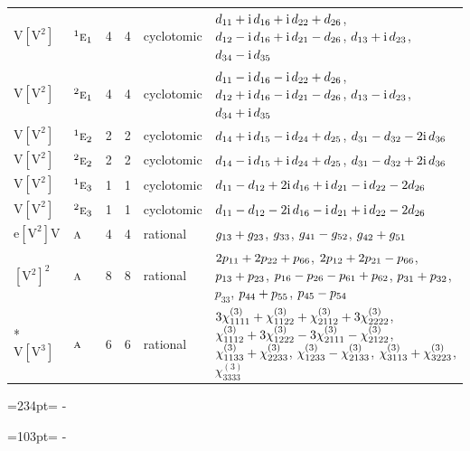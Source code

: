 \documentclass[10pt,a4paper]{article}
\newcommand{\needspace}[1]{\par\penalty-100\begingroup\dimen0=#1\relax\dimen2=\pagegoal
  \advance\dimen2-\pagetotal\ifdim\dimen0>\dimen2\relax\ifdim\dimen2>0pt\vfil\break\fi\fi
  \endgroup}
\numberwithin{equation}{section}
\newcommand{\irr}[1]{\text{\normalfont\scshape #1}}
\newcommand{\conjpair}[1]{{}^{#1}}
\newcommand{\iunit}{\mathrm{i}}
\newcommand{\jahn}[1]{\mathrm{#1}}
\newlength{\fillwidth}\newlength{\cellwidth}\newlength{\colwidth}
\newcommand{\signbreak}{\penalty100\relax}
\begin{document}
{\begin{longtable}{@{}llrrl>{\RaggedRight\arraybackslash}p{\fillwidth}@{}}
$\jahn{V[V^{2}]}$ & $\conjpair{1}\irr{e}_{1}$ & 4 & 4 & cyclotomic & $d_{11} +\signbreak \iunit{}\,d_{16} +\signbreak \iunit{}\,d_{22} +\signbreak d_{26}$, $d_{12} -\signbreak \iunit{}\,d_{16} +\signbreak \iunit{}\,d_{21} -\signbreak d_{26}$, $d_{13} +\signbreak \iunit{}\,d_{23}$, $d_{34} -\signbreak \iunit{}\,d_{35}$\\
$\jahn{V[V^{2}]}$ & $\conjpair{2}\irr{e}_{1}$ & 4 & 4 & cyclotomic & $d_{11} -\signbreak \iunit{}\,d_{16} -\signbreak \iunit{}\,d_{22} +\signbreak d_{26}$, $d_{12} +\signbreak \iunit{}\,d_{16} -\signbreak \iunit{}\,d_{21} -\signbreak d_{26}$, $d_{13} -\signbreak \iunit{}\,d_{23}$, $d_{34} +\signbreak \iunit{}\,d_{35}$\\
$\jahn{V[V^{2}]}$ & $\conjpair{1}\irr{e}_{2}$ & 2 & 2 & cyclotomic & $d_{14} +\signbreak \iunit{}\,d_{15} -\signbreak \iunit{}\,d_{24} +\signbreak d_{25}$, $d_{31} -\signbreak d_{32} -\signbreak 2\iunit{}\,d_{36}$\\
$\jahn{V[V^{2}]}$ & $\conjpair{2}\irr{e}_{2}$ & 2 & 2 & cyclotomic & $d_{14} -\signbreak \iunit{}\,d_{15} +\signbreak \iunit{}\,d_{24} +\signbreak d_{25}$, $d_{31} -\signbreak d_{32} +\signbreak 2\iunit{}\,d_{36}$\\
$\jahn{V[V^{2}]}$ & $\conjpair{1}\irr{e}_{3}$ & 1 & 1 & cyclotomic & $d_{11} -\signbreak d_{12} +\signbreak 2\iunit{}\,d_{16} +\signbreak \iunit{}\,d_{21} -\signbreak \iunit{}\,d_{22} -\signbreak 2d_{26}$\\
$\jahn{V[V^{2}]}$ & $\conjpair{2}\irr{e}_{3}$ & 1 & 1 & cyclotomic & $d_{11} -\signbreak d_{12} -\signbreak 2\iunit{}\,d_{16} -\signbreak \iunit{}\,d_{21} +\signbreak \iunit{}\,d_{22} -\signbreak 2d_{26}$\\
$\jahn{e[V^{2}]V}$ & $\irr{a}$ & 4 & 4 & rational & $\mathnormal{g}_{13} +\signbreak \mathnormal{g}_{23}$, $\mathnormal{g}_{33}$, $\mathnormal{g}_{41} -\signbreak \mathnormal{g}_{52}$, $\mathnormal{g}_{42} +\signbreak \mathnormal{g}_{51}$\\
$\jahn{[V^{2}]^{2}}$ & $\irr{a}$ & 8 & 8 & rational & $2p_{11} +\signbreak 2p_{22} +\signbreak p_{66}$, $2p_{12} +\signbreak 2p_{21} -\signbreak p_{66}$, $p_{13} +\signbreak p_{23}$, $p_{16} -\signbreak p_{26} -\signbreak p_{61} +\signbreak p_{62}$, $p_{31} +\signbreak p_{32}$, $p_{33}$, $p_{44} +\signbreak p_{55}$, $p_{45} -\signbreak p_{54}$\\*
$\jahn{V[V^{3}]}$ & $\irr{a}$ & 6 & 6 & rational & $3\chi^{(3)}_{1111} +\signbreak \chi^{(3)}_{1122} +\signbreak \chi^{(3)}_{2112} +\signbreak 3\chi^{(3)}_{2222}$, $\chi^{(3)}_{1112} +\signbreak 3\chi^{(3)}_{1222} -\signbreak 3\chi^{(3)}_{2111} -\signbreak \chi^{(3)}_{2122}$, $\chi^{(3)}_{1133} +\signbreak \chi^{(3)}_{2233}$, $\chi^{(3)}_{1233} -\signbreak \chi^{(3)}_{2133}$, $\chi^{(3)}_{3113} +\signbreak \chi^{(3)}_{3223}$, $\chi^{(3)}_{3333}$\\
\bottomrule\end{longtable}}
\needspace{234pt}
\needspace{103pt}
\end{document}
